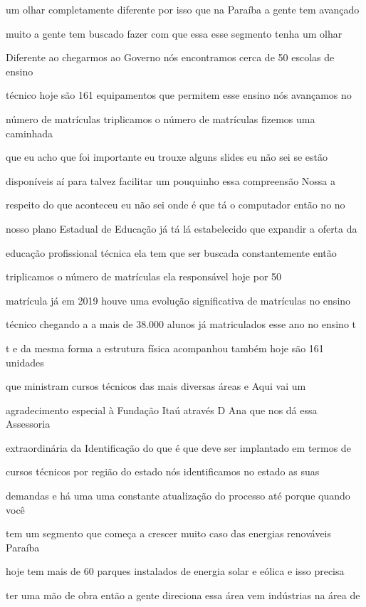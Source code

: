 \documentclass[a4paper,12pt]{article}
\begin{document}
um olhar completamente diferente por isso que na Paraíba a gente tem avançado

muito a gente tem buscado fazer com que essa esse segmento tenha um olhar

Diferente ao chegarmos ao Governo nós encontramos cerca de 50 escolas de ensino

técnico hoje são 161 equipamentos que permitem esse ensino nós avançamos no

número de matrículas triplicamos o número de matrículas fizemos uma caminhada

que eu acho que foi importante eu trouxe alguns slides eu não sei se estão

disponíveis aí para talvez facilitar um pouquinho essa compreensão Nossa a

respeito do que aconteceu eu não sei onde é que tá o computador então no no

nosso plano Estadual de Educação já tá lá estabelecido que expandir a oferta da

educação profissional técnica ela tem que ser buscada constantemente então

triplicamos o número de matrículas ela responsável hoje por 50%

matrícula já em 2019 houve uma evolução significativa de matrículas no ensino

técnico chegando a a mais de 38.000 alunos já matriculados esse ano no ensino t

t e da mesma forma a estrutura física acompanhou também hoje são 161 unidades

que ministram cursos técnicos das mais diversas áreas e Aqui vai um

agradecimento especial à Fundação Itaú através D Ana que nos dá essa Assessoria

extraordinária da Identificação do que é que deve ser implantado em termos de

cursos técnicos por região do estado nós identificamos no estado as suas

demandas e há uma uma constante atualização do processo até porque quando você

tem um segmento que começa a crescer muito caso das energias renováveis Paraíba

hoje tem mais de 60 parques instalados de energia solar e eólica e isso precisa

ter uma mão de obra então a gente direciona essa área vem indústrias na área de
\end{document}

